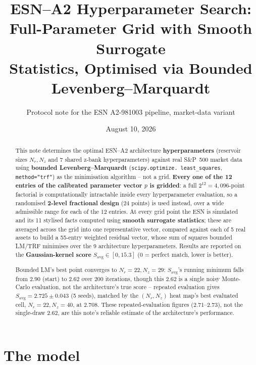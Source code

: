\documentclass[11pt]{article}
\title{ESN--A2 Hyperparameter Search: Full-Parameter Grid with Smooth Surrogate\\
Statistics, Optimised via Bounded Levenberg--Marquardt}
\author{Protocol note for the ESN A2-981003 pipeline, market-data variant}
\date{August 10, 2026}
\begin{document}
\maketitle

\begin{abstract}
This note determines the optimal ESN--A2 architecture \textbf{hyperparameters}
(reservoir sizes $N_r,N_z$ and 7 shared z-bank hyperparameters) against real S\&P~500
market data using \textbf{bounded Levenberg--Marquardt} (\texttt{scipy.optimize.
least\_squares}, \texttt{method="trf"}) as the minimisation algorithm -- not a grid.
\textbf{Every one of the 12 entries of the calibrated parameter vector $p$ is gridded}:
a full $2^{12}=4{,}096$-point factorial is computationally intractable inside every
hyperparameter evaluation, so a randomised \textbf{2-level fractional design} (24
points) is used instead, over a wide admissible range for each of the 12 entries. At
every grid point the ESN is simulated and its 11 stylised facts computed using
\textbf{smooth surrogate statistics}; these are averaged across the grid into one
representative vector, compared against each of 5 real assets to build a 55-entry
weighted residual vector, whose sum of squares bounded LM/TRF minimises over the 9
architecture hyperparameters. Results are reported on the \textbf{Gaussian-kernel
score} $S_{\text{avg}}\in[0,15.3]$ (0 = perfect match, lower is better).

Bounded LM's best point converges to $N_r=22,N_z=29$: $S_{\text{avg}}$'s running
minimum falls from $2.90$ (start) to $2.62$ over 200 iterations, though this $2.62$
is a single noisy Monte-Carlo evaluation, not the architecture's true score --
repeated evaluation gives $S_{\text{avg}}=2.725\pm0.043$ (5 seeds), matched by the
$(N_r,N_z)$ heat map's best evaluated cell, $N_r=22,N_z=40$, at $2.708$. These
repeated-evaluation figures ($2.71$--$2.73$), not the single-draw $2.62$, are this
note's reliable estimate of the architecture's performance.
\end{abstract}

\tableofcontents

\section{The model}
\end{document}
